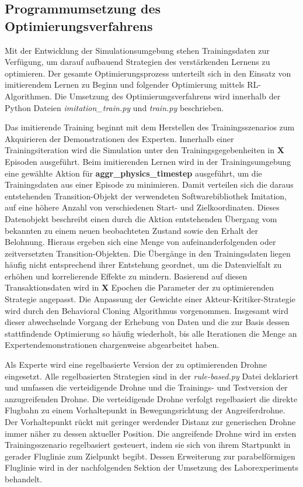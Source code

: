 \subsection{Programmumsetzung des Optimierungsverfahrens}

Mit der Entwicklung der Simulationsumgebung stehen Trainingsdaten zur Verfügung, um darauf aufbauend Strategien des verstärkenden Lernens zu optimieren.
Der gesamte Optimierungsprozess unterteilt sich in den Einsatz von imitierendem Lernen zu Beginn und folgender Optimierung mittels RL-Algorithmen. 
Die Umsetzung des Optimierungsverfahrens wird innerhalb der Python Dateien \textit{imitation\_train.py} und \textit{train.py} beschrieben.

Das imitierende Training beginnt mit dem Herstellen des Trainingsszenarios zum Akquirieren der Demonstrationen des Experten. 
Innerhalb einer Trainingsiteration wird die Simulation unter den Trainingsgegebenheiten in \textbf{X} Episoden ausgeführt.
Beim imitierenden Lernen wird in der Trainingsumgebung eine gewählte Aktion für \textbf{aggr\_physics\_timestep} ausgeführt, um die Trainingsdaten aus einer Episode zu minimieren.
Damit verteilen sich die daraus entstehenden Transition-Objekt der verwendeten Softwarebibliothek Imitation, auf eine höhere Anzahl von verschiedenen Start- und Zielkoordinaten.
Dieses Datenobjekt beschreibt einen durch die Aktion entstehenden Übergang vom bekannten zu einem neuen beobachteten Zustand sowie den Erhalt der Belohnung.
Hieraus ergeben sich eine Menge von aufeinanderfolgenden oder zeitversetzten Transition-Objekten.
Die Übergänge in den Trainingsdaten liegen häufig nicht entsprechend ihrer Entstehung geordnet, um die Datenvielfalt zu erhöhen und korrelierende Effekte zu mindern. 
Basierend auf diesen Transaktionsdaten wird in \textbf{X} Epochen die Parameter der zu optimierenden Strategie angepasst.
Die Anpassung der Gewichte einer Akteur-Kritiker-Strategie wird durch den Behavioral Cloning Algorithmus vorgenommen.
Insgesamt wird dieser abwechselnde Vorgang der Erhebung von Daten und die zur Basis dessen stattfindende Optimierung so häufig wiederholt, bis alle Iterationen die Menge an Expertendemonstrationen chargenweise abgearbeitet haben.

Als Experte wird eine regelbasierte Version der zu optimierenden Drohne eingesetzt. 
Alle regelbasierten Strategien sind in der \textit{rule-based.py} Datei deklariert und umfassen die verteidigende Drohne und die Trainings- und Testversion der anzugreifenden Drohne.
Die verteidigende Drohne verfolgt regelbasiert die direkte Flugbahn zu einem Vorhaltepunkt in Bewegungsrichtung der Angreiferdrohne.
Der Vorhaltepunkt rückt mit geringer werdender Distanz zur generischen Drohne immer näher zu dessen aktueller Position.
Die angreifende Drohne wird im ersten Trainingsszenario regelbasiert gesteuert, indem sie sich von ihrem Startpunkt in gerader Fluglinie zum Zielpunkt begibt.
Dessen Erweiterung zur parabelförmigen Fluglinie wird in der nachfolgenden Sektion der Umsetzung des Laborexperiments behandelt. 

